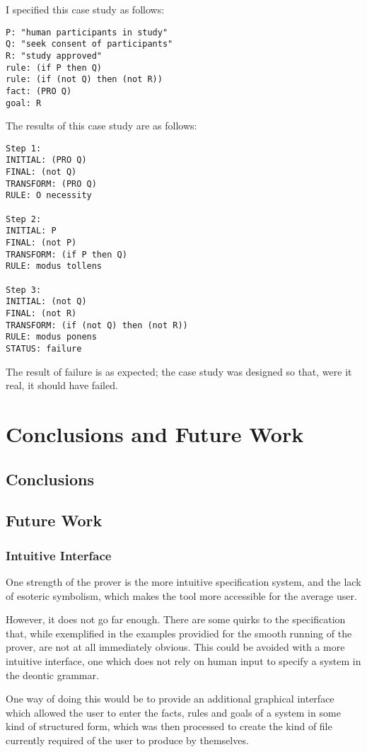 \documentclass{l4proj}
\begin{document}
I specified this case study as follows: 
\begin{verbatim}
P: "human participants in study" 
Q: "seek consent of participants"
R: "study approved"
rule: (if P then Q)
rule: (if (not Q) then (not R))
fact: (PRO Q)
goal: R
\end{verbatim}

The results of this case study are as follows: 
\begin{verbatim}
Step 1: 
INITIAL: (PRO Q)
FINAL: (not Q)
TRANSFORM: (PRO Q)
RULE: O necessity

Step 2: 
INITIAL: P
FINAL: (not P)
TRANSFORM: (if P then Q)
RULE: modus tollens

Step 3: 
INITIAL: (not Q)
FINAL: (not R)
TRANSFORM: (if (not Q) then (not R))
RULE: modus ponens
STATUS: failure
\end{verbatim}
The result of failure is as expected; the case study was designed so that, were it real, it should have failed. 
\chapter{Conclusions and Future Work}

\section{Conclusions}

\section{Future Work}

\subsection{Intuitive Interface}
One strength of the prover is the more intuitive specification system, and the lack of esoteric symbolism, which makes the tool more accessible for the average user. 

However, it does not go far enough. There are some quirks to the specification that, while exemplified in the examples providied for the smooth running of the prover, are not at all immediately obvious. This could be avoided with a more intuitive interface, one which does not rely on human input to specify a system in the deontic grammar. 

One way of doing this would be to provide an additional graphical interface which allowed the user to enter the facts, rules and goals of a system in some kind of structured form, which was then processed to create the kind of file currently required of the user to produce by themselves. 
\end{document}
